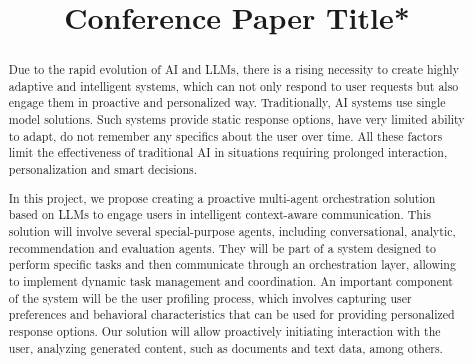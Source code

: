 \documentclass[conference]{IEEEtran}
\begin{document}
\title{Conference Paper Title*}

\author{
\and
\and
\and
}

\maketitle

\begin{abstract}
Due to the rapid evolution of AI and LLMs, there is a rising necessity to create highly adaptive and intelligent systems, which can not only respond to user requests but also engage them in proactive and personalized way. Traditionally, AI systems use single model solutions. Such systems provide static response options, have very limited ability to adapt, do not
remember any specifics about the user over time. All these factors limit the effectiveness of traditional AI in situations requiring prolonged interaction, personalization and smart decisions.

In this project, we propose creating a proactive multi-agent orchestration solution based on LLMs to engage users in intelligent context-aware communication. This solution will involve several special-purpose agents, including conversational, analytic, recommendation and evaluation agents. They will be part of a system designed to perform specific tasks and then communicate through an orchestration layer, allowing to implement dynamic task management and coordination. An important component of the system will be the user profiling process, which involves capturing user preferences and behavioral characteristics that can be used for providing personalized response options. Our solution will allow proactively initiating interaction with the user, analyzing generated content, such as documents and text data, among others.
\end{abstract}
\end{document}

